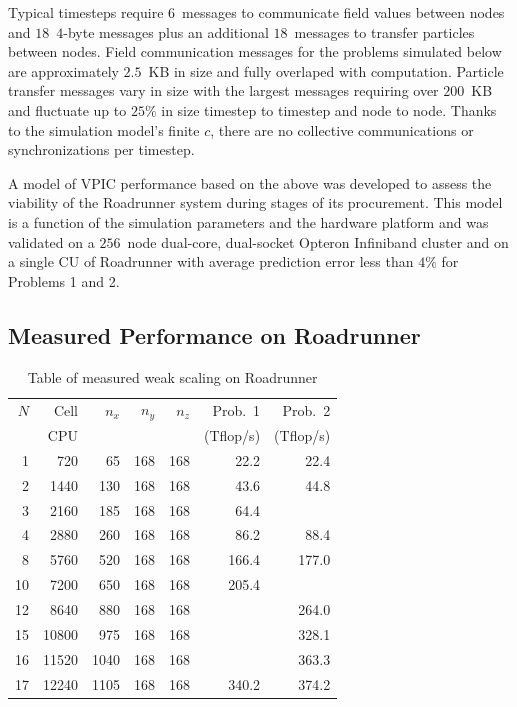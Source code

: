 \documentclass[journal,twoside]{IEEEtran}
\begin{document}
Typical timesteps require $6$~messages to communicate field values
between nodes and $18$~$4$-byte messages plus an additional
$18$~messages to transfer particles between nodes.  Field
communication messages for the problems simulated below are
approximately $2.5$~KB in size and fully overlaped with computation.
Particle transfer messages vary in size with the largest messages
requiring over $200$~KB and fluctuate up to $25\%$ in size timestep to
timestep and node to node.  Thanks to the simulation model's finite
$c$, there are no collective communications or synchronizations per
timestep.

A model of VPIC performance based on the above was developed to assess
the viability of the Roadrunner system during stages of its
procurement.  This model is a function of the simulation parameters
and the hardware platform and was validated on a $256$~node dual-core,
dual-socket Opteron Infiniband cluster and on a single CU of
Roadrunner with average prediction error less than $4\%$ for Problems
1 and 2.

\subsection{Measured Performance on Roadrunner}

\begin{table}
\caption{Table of measured weak scaling on Roadrunner}
\begin{center}
\begin{tabular}{rrrrrrr}
\hline
\hline
$N$ &  Cell & $n_x$ & $n_y$ & $n_z$ &   Prob.~1 &   Prob.~2  \\
    &   CPU &       &       &       & (Tflop/s) & (Tflop/s)  \\
\hline
  1 &   720 &    65 &   168 &   168 &      22.2 &      22.4  \\ 
  2 &  1440 &   130 &   168 &   168 &      43.6 &      44.8  \\
  3 &  2160 &   185 &   168 &   168 &      64.4 &            \\
  4 &  2880 &   260 &   168 &   168 &      86.2 &      88.4  \\
  8 &  5760 &   520 &   168 &   168 &     166.4 &     177.0  \\
 10 &  7200 &   650 &   168 &   168 &     205.4 &            \\
 12 &  8640 &   880 &   168 &   168 &           &     264.0  \\
 15 & 10800 &   975 &   168 &   168 &           &     328.1  \\
 16 & 11520 &  1040 &   168 &   168 &           &     363.3  \\
 17 & 12240 &  1105 &   168 &   168 &     340.2 &     374.2  \\
\hline
\end{tabular}
\end{center}
\label{tbl:weakscaling}
\end{table}
\end{document}
